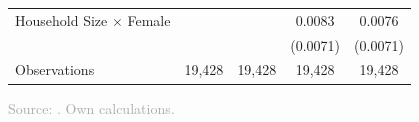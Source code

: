 \documentclass[11pt, aspectratio=1610, xcolor={dvipsnames}]{beamer}
\begin{document}
\begin{frame}
{\begin{table}[h]
\begin{tabular}{l*{4}{c}}
					\addlinespace
					Household Size $\times$ Female&                     &                     &      \textcolor{PineGreen}{0.0083}         &      0.0076         \\
					&                     &                     &    \textcolor{PineGreen}{(0.0071)}         &    (0.0071)         \\
					\midrule
					Observations        &       19,428         &       19,428         &       19,428         &       19,428         \\
					\bottomrule
				\end{tabular}
			\end{table}
		}
		
		{\scriptsize
			\textcolor{darkgray}{Source: \cite{SOEP2023}. Own calculations.}
		}
		
	\end{frame}
	
\end{document}
